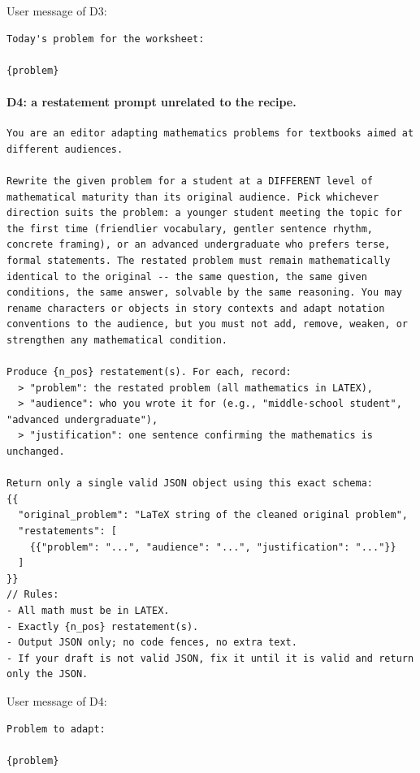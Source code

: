 User message of D3:
\begin{Verbatim}[breaklines=true,breakanywhere=true,fontsize=\small]
Today's problem for the worksheet:

{problem}
\end{Verbatim}

\paragraph{D4: a restatement prompt unrelated to the recipe.}
\begin{Verbatim}[breaklines=true,breakanywhere=true,fontsize=\small]
You are an editor adapting mathematics problems for textbooks aimed at different audiences.

Rewrite the given problem for a student at a DIFFERENT level of mathematical maturity than its original audience. Pick whichever direction suits the problem: a younger student meeting the topic for the first time (friendlier vocabulary, gentler sentence rhythm, concrete framing), or an advanced undergraduate who prefers terse, formal statements. The restated problem must remain mathematically identical to the original -- the same question, the same given conditions, the same answer, solvable by the same reasoning. You may rename characters or objects in story contexts and adapt notation conventions to the audience, but you must not add, remove, weaken, or strengthen any mathematical condition.

Produce {n_pos} restatement(s). For each, record:
  > "problem": the restated problem (all mathematics in LATEX),
  > "audience": who you wrote it for (e.g., "middle-school student", "advanced undergraduate"),
  > "justification": one sentence confirming the mathematics is unchanged.

Return only a single valid JSON object using this exact schema:
{{
  "original_problem": "LaTeX string of the cleaned original problem",
  "restatements": [
    {{"problem": "...", "audience": "...", "justification": "..."}}
  ]
}}
// Rules:
- All math must be in LATEX.
- Exactly {n_pos} restatement(s).
- Output JSON only; no code fences, no extra text.
- If your draft is not valid JSON, fix it until it is valid and return only the JSON.
\end{Verbatim}

User message of D4:
\begin{Verbatim}[breaklines=true,breakanywhere=true,fontsize=\small]
Problem to adapt:

{problem}
\end{Verbatim}

